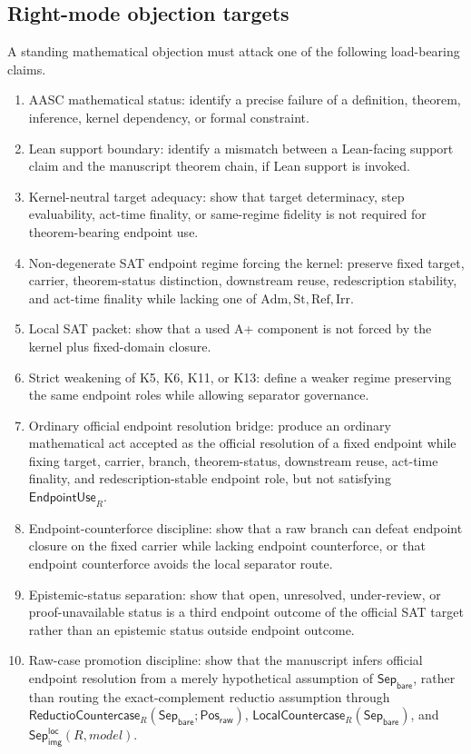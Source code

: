 \documentclass[11pt]{article}
\theoremstyle{definition}
\theoremstyle{remark}
\newcommand{\PosRaw}{\mathsf{Pos}_{\mathsf{raw}}}
\newcommand{\SepBare}{\mathsf{Sep}_{\mathsf{bare}}}
\newcommand{\LocalSepImgOcc}{\mathsf{Sep}_{\mathsf{img}}^{\mathsf{loc}}}
\newcommand{\Adm}{\mathrm{Adm}}
\newcommand{\St}{\mathrm{St}}
\newcommand{\RefK}{\mathrm{Ref}}
\newcommand{\Irr}{\mathrm{Irr}}
\newcommand{\EndpointUse}{\mathsf{EndpointUse}}
\newcommand{\LocalCountercase}{\mathsf{LocalCountercase}}
\newcommand{\ReductioCountercase}{\mathsf{ReductioCountercase}}
\begin{document}
\subsection*{Right-mode objection targets}
A standing mathematical objection must attack one of the following load-bearing claims.
\begin{enumerate}
\item AASC mathematical status: identify a precise failure of a definition, theorem, inference, kernel dependency, or formal constraint.
\item Lean support boundary: identify a mismatch between a Lean-facing support claim and the manuscript theorem chain, if Lean support is invoked.
\item Kernel-neutral target adequacy: show that target determinacy, step evaluability, act-time finality, or same-regime fidelity is not required for theorem-bearing endpoint use.
\item Non-degenerate SAT endpoint regime forcing the kernel: preserve fixed target, carrier, theorem-status distinction, downstream reuse, redescription stability, and act-time finality while lacking one of \(\Adm,\St,\RefK,\Irr\).
\item Local SAT packet: show that a used A+ component is not forced by the kernel plus fixed-domain closure.
\item Strict weakening of K5, K6, K11, or K13: define a weaker regime preserving the same endpoint roles while allowing separator governance.
\item Ordinary official endpoint resolution bridge: produce an ordinary mathematical act accepted as the official resolution of a fixed endpoint while fixing target, carrier, branch, theorem-status, downstream reuse, act-time finality, and redescription-stable endpoint role, but not satisfying \(\EndpointUse_R\).
\item Endpoint-counterforce discipline: show that a raw branch can defeat endpoint closure on the fixed carrier while lacking endpoint counterforce, or that endpoint counterforce avoids the local separator route.
\item Epistemic-status separation: show that open, unresolved, under-review, or proof-unavailable status is a third endpoint outcome of the official SAT target rather than an epistemic status outside endpoint outcome.
\item Raw-case promotion discipline: show that the manuscript infers official endpoint resolution from a merely hypothetical assumption of \(\SepBare\), rather than routing the exact-complement reductio assumption through \(\ReductioCountercase_R(\SepBare;\PosRaw)\), \(\LocalCountercase_R(\SepBare)\), and \(\LocalSepImgOcc(R,model)\).

\end{enumerate}
\end{document}
